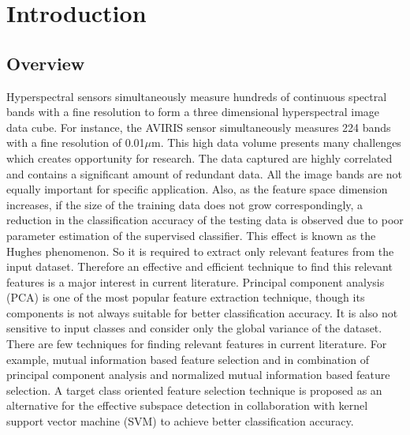 \documentclass[document.tex]{subfiles}
\begin{document}
	
\chapter{Introduction}

\section{Overview}
\noindent Hyperspectral sensors simultaneously measure hundreds of continuous spectral bands with a fine resolution to form a three dimensional hyperspectral image data cube. For instance, the AVIRIS sensor simultaneously measures 224 bands with a fine resolution of 0.01$\mu$m. This high data volume presents many challenges which creates opportunity for research. The data captured are highly correlated and contains a significant amount of redundant data. All the image bands are not equally important for specific application.  Also, as the feature space dimension increases, if the size of the training data does not grow correspondingly, a reduction in the classification accuracy of the testing data is observed due to poor parameter estimation of the supervised classifier. This effect is known as the Hughes phenomenon. So it is required to extract only relevant features from the input dataset. Therefore an effective and efficient technique to find this relevant features is a major interest in current literature. Principal component analysis (PCA) is one of the most popular feature extraction technique, though its components is not always suitable for better classification accuracy. It is also not sensitive to input classes and consider only the global variance of the dataset. There are few techniques for finding relevant features in current literature. For example, mutual information based feature selection and in combination of principal component analysis and normalized mutual information based feature selection. A target class oriented feature selection technique is proposed as an alternative for the effective subspace detection in collaboration with kernel support vector machine (SVM) to achieve better classification accuracy.

\clearpage  
\end{document}
